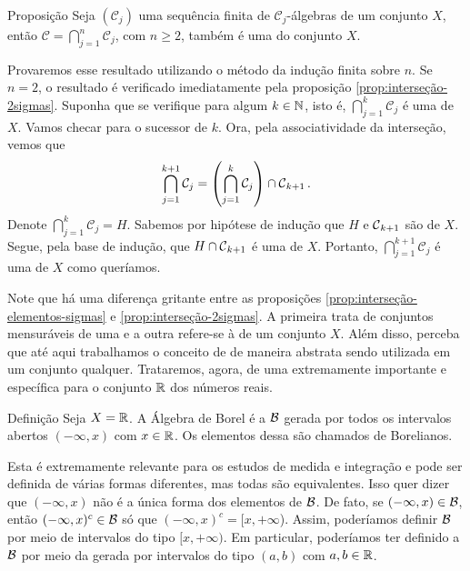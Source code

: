 \begin{resultado}{Proposição}
\label{prop:interseção-sigmas}
    Seja $(\mathcal{C}_j)$ uma sequência finita de $\mathcal{C}_j$-álgebras de um conjunto $X$, então 
    $\mathcal{C} = \displaystyle \bigcap_{j =1}^n\mathcal{C}_j$, com $n \geq 2$, também é uma \sigal do conjunto $X$.
    
\end{resultado}
\begin{prova}
    Provaremos esse resultado utilizando o método da indução finita sobre $n$.
    Se $n = 2$, o resultado é verificado imediatamente pela proposição \ref{prop:interseção-2sigmas}.
    Suponha que se verifique para algum $k \in \operatorname{\mathbb{N}}$, isto é, $\displaystyle \bigcap_{j =1}^k\mathcal{C}_j$ é uma \sigal de $X$.
    Vamos checar para o sucessor de $k$.
    Ora, pela associatividade da interseção, vemos que 
    \begin{align*}
        \displaystyle \bigcap_{j =1}^{k+1}\mathcal{C}_j = \left(\displaystyle \bigcap_{j =1}^k\mathcal{C}_j\right) \cap \operatorname{\mathcal{C}}_{k+1}.
  	\end{align*}
	Denote $\displaystyle \bigcap_{j =1}^k\mathcal{C}_j = H$. 
	Sabemos por hipótese de indução que $H$  e $\operatorname{\mathcal{C}}_{k+1}$ são  \sigals de $X$. 
	Segue, pela base de indução, que $H \cap \operatorname{\mathcal{C}}_{k+1}$ é uma \sigal de $X$.
	Portanto, $\displaystyle \bigcap_{j =1}^{k+1}\mathcal{C}_j$ é uma \sigal de $X$ como queríamos.
\end{prova}

Note que há uma diferença gritante entre as proposições \ref{prop:interseção-elementos-sigmas} e \ref{prop:interseção-2sigmas}.
A primeira trata de conjuntos mensuráveis de uma \sigal e a outra refere-se à \sigals de um conjunto $X$.
Além disso, perceba que até aqui trabalhamos o conceito de \sigal de maneira abstrata sendo utilizada em um conjunto qualquer. 
Trataremos, agora, de uma \sigal extremamente importante e específica para o conjunto $\mathbb{R}$ dos números reais.

\begin{resultado}{Definição}
\label{def:algebra-borel}
    Seja $X = \mathbb{R}$. A Álgebra de Borel é a \sigal $\operatorname{\mathcal{B}}$ gerada por todos os intervalos abertos $(-\infty,x)$ com $ x  \in \mathbb{R}$. 
    Os elementos dessa \sigal são chamados de Borelianos.

\end{resultado}

Esta \sigal é extremamente relevante para os estudos de medida e integração e pode ser definida de várias formas diferentes, mas todas são equivalentes.
Isso quer dizer que $(-\infty, x)$ não é a única forma dos elementos de $\operatorname{\mathcal{B}}$. 
De fato, se  $(-\infty, x) \in \operatorname{\mathcal{B}}$, então $(-\infty, x)^c \in \operatorname{\mathcal{B}}$ só que $(-\infty, x)^c = [x, +\infty$).
Assim, poderíamos  definir  $\operatorname{\mathcal{B}}$ por meio de intervalos do tipo $[x, +\infty)$.
Em particular, poderíamos ter definido a $\operatorname{\mathcal{B}}$ por meio da \sigal gerada por intervalos do tipo $(a,b)$ com $a,b \in \mathbb{R}$. 


